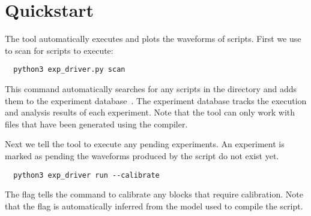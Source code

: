 \chapter{Quickstart}

The  tool automatically executes and plots the waveforms
of \grendel scripts. First we use \expdriver to scan for \grendel scripts to execute:

\begin{lstlisting}
  python3 exp_driver.py scan
\end{lstlisting}

This command automatically searches for any \grendel scripts in the 
directory and adds them to the experiment database~\cite{experiment.db}. The
experiment database tracks the execution and analysis results of each
experiment. Note that the  tool can only work with files that
have been generated using the \legno compiler.

Next we tell the \expdriver tool to execute any pending experiments. An
experiment is marked as pending the waveforms produced by the \grendel script do
not exist yet. 

\begin{lstlisting}
  python3 exp_driver run --calibrate
\end{lstlisting}

The  flag tells the \expdriver command to calibrate any
blocks that require calibration. Note that the  flag is
automatically inferred from the model used to compile the script.
